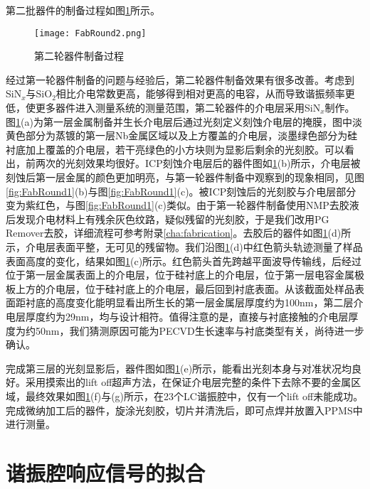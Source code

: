             第二批器件的制备过程如图\ref{fig:FabRound2}所示。



            \begin{figure}[h]
                \centering
                \texttt{[image: FabRound2.png]}
                \caption{第二轮器件制备过程}
                \label{fig:FabRound2}
            \end{figure}

            经过第一轮器件制备的问题与经验后，第二轮器件制备效果有很多改善。考虑到SiN$_x$与SiO$_2$相比介电常数更高，能够得到相对更高的电容，从而导致谐振频率更低，使更多器件进入测量系统的测量范围，第二轮器件的介电层采用SiN$_x$制作。图\ref{fig:FabRound2}(a)为第一层金属制备并生长介电层后通过光刻定义刻蚀介电层的掩膜，图中淡黄色部分为蒸镀的第一层Nb金属区域以及上方覆盖的介电层，淡墨绿色部分为硅衬底加上覆盖的介电层，若干亮绿色的小方块则为显影后剩余的光刻胶。可以看出，前两次的光刻效果均很好。ICP刻蚀介电层后的器件图如\ref{fig:FabRound2}(b)所示，介电层被刻蚀后第一层金属的颜色更加明亮，与第一轮器件制备中观察到的现象相同，见图\ref{fig:FabRound1}(b)与图\ref{fig:FabRound1}(c)。被ICP刻蚀后的光刻胶与介电层部分变为紫红色，与图\ref{fig:FabRound1}(c)类似。由于第一轮器件制备使用NMP去胶液后发现介电材料上有残余灰色纹路，疑似残留的光刻胶，于是我们改用PG Remover去胶，详细流程可参考附录\ref{cha:fabrication}。去胶后的器件如图\ref{fig:FabRound2}(d)所示，介电层表面平整，无可见的残留物。我们沿图\ref{fig:FabRound2}(d)中红色箭头轨迹测量了样品表面高度的变化，结果如图\ref{fig:FabRound2}(c)所示。红色箭头首先跨越平面波导传输线，后经过位于第一层金属表面上的介电层，位于硅衬底上的介电层，位于第一层电容金属极板上方的介电层，位于硅衬底上的介电层，最后回到衬底表面。从该截面处样品表面距衬底的高度变化能明显看出所生长的第一层金属层厚度约为100nm，第二层介电层厚度约为29nm，均与设计相符。值得注意的是，直接与衬底接触的介电层厚度为约50nm，我们猜测原因可能为PECVD生长速率与衬底类型有关，尚待进一步确认。

            完成第三层的光刻显影后，器件图如图\ref{fig:FabRound2}(e)所示，能看出光刻本身与对准状况均良好。采用摸索出的lift off超声方法，在保证介电层完整的条件下去除不要的金属区域，最终效果如图\ref{fig:FabRound2}(f)与(g)所示，在23个LC谐振腔中，仅有一个lift off未能成功。完成微纳加工后的器件，旋涂光刻胶，切片并清洗后，即可点焊并放置入PPMS中进行测量。



            



            \section{谐振腔响应信号的拟合} %
            \label{sec:谐振腔响应信号的拟合}
            	









